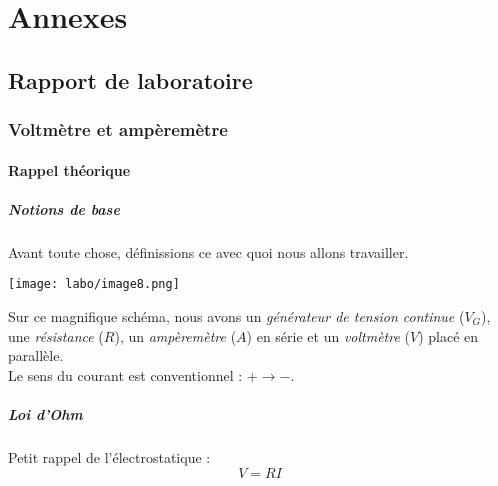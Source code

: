 \documentclass[british,french,11pt, a4paper, openany]{book}
\begin{document}
		
		
		
		
		
		\appendix
		\part{Annexes}
		\chapter{Rapport de laboratoire}
		\section{Voltmètre et ampèremètre}
		\subsection{Rappel théorique}
		\subsubsection{Notions de base}
		Avant toute chose, définissions ce avec quoi nous allons travailler.
		\begin{center}
			\texttt{[image: labo/image8.png]}
		\end{center}
		Sur ce magnifique schéma, nous avons un \textit{générateur de tension continue} ($V_G$), une \textit{résistance} ($R$), un \textit{ampèremètre} ($A$) en série et un \textit{voltmètre} ($V$) placé en parallèle.\\
		Le sens du courant est conventionnel : $+ \rightarrow -$.
		
		\subsubsection*{Loi d'Ohm}
		Petit rappel de l'électrostatique :
		\begin{equation}
			V = RI
		\end{equation}
		
\end{document}
